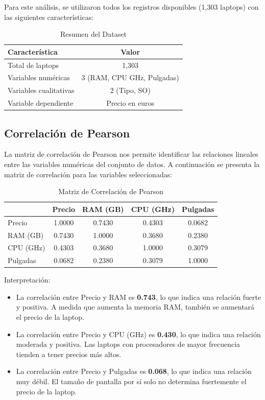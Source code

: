 \documentclass[12pt,a4paper]{article}
\begin{document}
Para este análisis, se utilizaron todos los registros disponibles (1,303 laptops) con las siguientes características:

\begin{table}[H]
\centering
\caption{Resumen del Dataset}
\begin{tabular}{lc}
\toprule
\textbf{Característica} & \textbf{Valor} \\
\midrule
Total de laptops & 1,303 \\
Variables numéricas & 3 (RAM, CPU GHz, Pulgadas) \\
Variables cualitativas & 2 (Tipo, SO) \\
Variable dependiente & Precio en euros \\
\bottomrule
\end{tabular}
\end{table}

\subsection{Correlación de Pearson}

La matriz de correlación de Pearson nos permite identificar las relaciones lineales entre las variables numéricas del conjunto de datos. A continuación se presenta la matriz de correlación para las variables seleccionadas:

\begin{table}[H]
\centering
\caption{Matriz de Correlación de Pearson}
\begin{tabular}{lcccc}
\toprule
 & \textbf{Precio} & \textbf{RAM (GB)} & \textbf{CPU (GHz)} & \textbf{Pulgadas} \\
\midrule
Precio & 1.0000 & 0.7430 & 0.4303 & 0.0682 \\
RAM (GB) & 0.7430 & 1.0000 & 0.3680 & 0.2380 \\
CPU (GHz) & 0.4303 & 0.3680 & 1.0000 & 0.3079 \\
Pulgadas & 0.0682 & 0.2380 & 0.3079 & 1.0000 \\
\bottomrule
\end{tabular}
\end{table}

Interpretación:
\begin{itemize}
    \item La correlación entre Precio y RAM es \textbf{0.743}, lo que indica una relación fuerte y positiva. A medida que aumenta la memoria RAM, también se aumentará el precio de la laptop.
    
    \item La correlación entre Precio y CPU (GHz) es \textbf{0.430}, lo que indica una relación moderada y positiva. Las laptops con procesadores de mayor frecuencia tienden a tener precios más altos.
    
    \item La correlación entre Precio y Pulgadas es \textbf{0.068}, lo que indica una relación muy débil. El tamaño de pantalla por sí solo no determina fuertemente el precio de la laptop.
    
\end{itemize}
\end{document}
